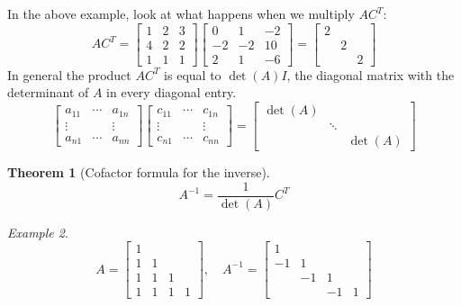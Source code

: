 \documentclass[11pt,oneside]{amsbook}
\theoremstyle{definition}
\theoremstyle{plain}
\newtheorem{theorem}{Theorem}[section]
\theoremstyle{definition}
\theoremstyle{remark}
\newtheorem{example}[theorem]{Example}
\numberwithin{equation}{section}
\numberwithin{figure}{section}
\begin{document}
In the above example, look at what happens when we multiply $AC^T$:
\[AC^T=\begin{bmatrix}1&2&3\\4&2&2\\1&1&1\end{bmatrix}
  \begin{bmatrix}0&1&-2\\-2&-2&10\\2&1&-6\end{bmatrix}
  =\begin{bmatrix}2\\&2\\&&2\end{bmatrix}
\]
In general the product $AC^T$ is equal to $\det(A)I$, the diagonal matrix with the determinant of $A$ in every diagonal entry.
\[\begin{bmatrix}
    a_{11}&\cdots&a_{1n}\\
    \vdots&&\vdots\\
    a_{n1}&\cdots&a_{nn}
  \end{bmatrix}
  \begin{bmatrix}
    c_{11}&\cdots&c_{1n}\\
    \vdots&&\vdots\\
    c_{n1}&\cdots&c_{nn}
  \end{bmatrix}
  =\begin{bmatrix}
    \det(A)\\&\ddots\\&&\det(A)
  \end{bmatrix}
\]

\begin{theorem}[Cofactor formula for the inverse]
  \[A^{-1}=\frac{1}{\det(A)}C^T
  \]
\end{theorem}

\begin{example}
  \[A=\begin{bmatrix}1\\1&1\\1&1&1\\1&1&1&1\end{bmatrix},\quad
    A^{-1}=\begin{bmatrix}1\\-1&1\\&-1&1\\&&-1&1\end{bmatrix}
  \]
\end{example}
\end{document}
